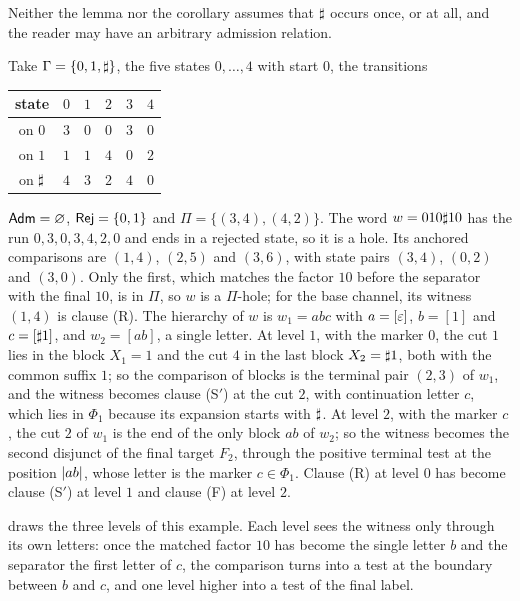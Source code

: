 Neither the lemma nor the corollary assumes that $\sharp$ occurs once, or at
all, and the reader may have an arbitrary admission relation.

\begin{example}\label{ex:mo-loses-tower}
Take $\Gamma=\{0,1,\sharp\}$, the five states $0,\ldots,4$ with start $0$, the
transitions
\begin{center}
\begin{tabular}{@{}c|ccccc@{}}
state & $0$ & $1$ & $2$ & $3$ & $4$\\
\hline
on $0$ & $3$ & $0$ & $0$ & $3$ & $0$\\
on $1$ & $1$ & $1$ & $4$ & $0$ & $2$\\
on $\sharp$ & $4$ & $3$ & $2$ & $4$ & $0$
\end{tabular}
\end{center}
$\mathsf{Adm}=\varnothing$, $\mathsf{Rej}=\{0,1\}$ and $\Pi=\{(3,4),(4,2)\}$. The word
$w=010\sharp10$ has the run $0,3,0,3,4,2,0$ and ends in a rejected state, so it is
a hole. Its anchored comparisons are $(1,4)$, $(2,5)$ and $(3,6)$, with state
pairs $(3,4)$, $(0,2)$ and $(3,0)$. Only the first, which matches the factor
$10$ before the separator with the final $10$, is in $\Pi$, so $w$ is a
$\Pi$-hole; for the base channel, its witness $(1,4)$ is clause (R). The
hierarchy of $w$ is $w_1=abc$ with $a=[\varepsilon]$, $b=[1]$ and $c=[\sharp1]$, and
$w_2=[ab]$, a single letter. At level $1$, with the marker $0$, the cut $1$
lies in the block $X_1=1$ and the cut $4$ in the last block $X_2=\sharp1$, both
with the common suffix $1$; so the comparison of blocks is the terminal pair
$(2,3)$ of $w_1$, and the witness becomes clause (S$'$) at the cut $2$, with
continuation letter $c$, which lies in $\Phi_1$ because its expansion starts
with $\sharp$. At level $2$, with the marker $c$, the cut $2$ of $w_1$ is the end
of the only block $ab$ of $w_2$; so the witness becomes the second disjunct of
the final target $F_2$, through the positive terminal test at the position
$\lvert ab\rvert$, whose letter is the marker $c\in\Phi_1$. Clause (R) at level $0$
has become clause (S$'$) at level $1$ and clause (F) at level $2$.
\end{example}

 draws the three levels of this example. Each level sees
the witness only through its own letters: once the matched factor $10$ has
become the single letter $b$ and the separator the first letter of $c$, the
comparison turns into a test at the boundary between $b$ and $c$, and one
level higher into a test of the final label.

